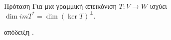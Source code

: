 \begin{namedthrm}{Πρόταση}
    Για μια γραμμική απεικόνιση $T:V\rightarrow W$ ισχύει $\dim im T^{*} = 
    \dim(\ker T)^{\bot}$. 
    
     απόδειξη \cite{strang2006linear}.
    \label{dim}
\end{namedthrm}



